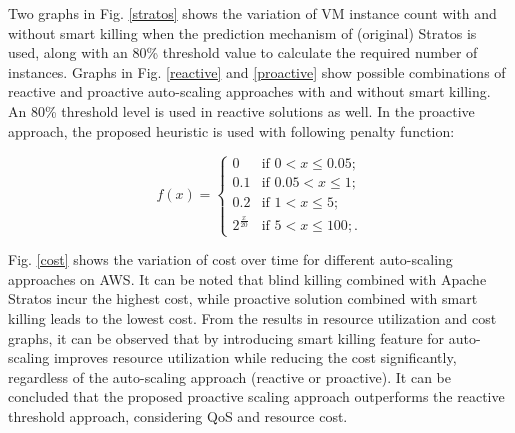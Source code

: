 Two graphs in Fig. \ref{stratos} shows the variation of VM instance count with and without smart killing when the prediction mechanism of (original) Stratos is used, along with an 80\% threshold value to calculate the required number of instances. Graphs in Fig. \ref{reactive} and \ref{proactive} show possible combinations of reactive and proactive auto-scaling approaches with and without smart killing. An 80\% threshold level is used in reactive solutions as well. In the proactive approach, the proposed heuristic is used with following penalty function:

$$f(x) = \begin{cases} 
0 & \text{if $0 < x \le 0.05$}; \\
0.1 & \text{if $0.05 < x \le 1$}; \\
0.2 & \text{if $1 < x \le 5$};\\
2^{\frac{x}{20}} & \text{if $5 < x \le 100$};.\end{cases} $$

Fig. \ref{cost} shows the variation of cost over time for different auto-scaling approaches on AWS. It can be noted that blind killing combined with Apache Stratos incur the highest cost, while proactive solution combined with smart killing leads to the lowest cost. From the results in resource utilization and cost graphs, it can be observed that by introducing smart killing feature for auto-scaling improves resource utilization while reducing the cost significantly, regardless of the auto-scaling approach (reactive or proactive). It can be concluded that the proposed proactive scaling approach outperforms the reactive threshold approach, considering QoS and resource cost.